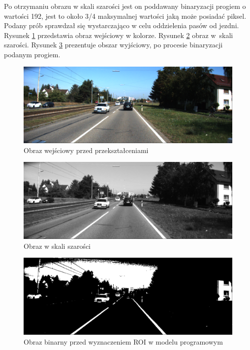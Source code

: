 Po otrzymaniu obrazu w skali szarości jest on poddawany binaryzacji progiem o wartości 192, jest to około 3/4 maksymalnej wartości jaką może posiadać piksel.
Podany prób sprawdzał się wystarczająco w celu oddzielenia pasów od jezdni. 
Rysunek \ref{fig:im_color} przedstawia obraz wejściowy w kolorze. Rysunek \ref{fig:im_grey} obraz w~skali szarości. Rysunek \ref{fig:in_ROI} prezentuje obszar wyjściowy, po procesie binaryzacji podanym progiem.

\begin{figure}[h]
	\centering
	\includegraphics[scale=0.3]{obraz_color.png}
	\caption{Obraz wejściowy przed przekształceniami}
	\label{fig:im_color}
\end{figure}
\begin{figure}[h]
	\centering
	\includegraphics[scale=0.3]{obraz_grey.png}
	\caption{Obraz w skali szarości}
	\label{fig:im_grey}
\end{figure}
\begin{figure}[h]
	\centering
	\includegraphics[scale=0.3]{obraz_binarny.png}
	\caption{Obraz binarny przed wyznaczeniem ROI w modelu programowym}
	\label{fig:in_ROI}
\end{figure}
